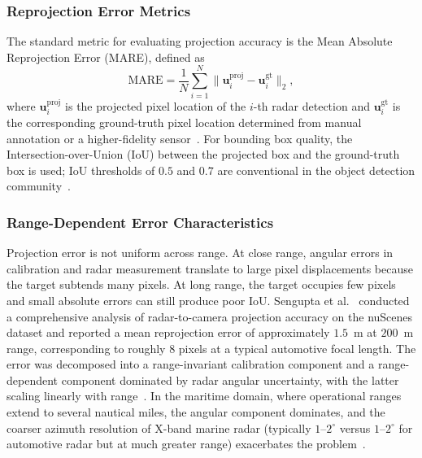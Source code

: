 \subsubsection{Reprojection Error Metrics}

The standard metric for evaluating projection accuracy is the Mean Absolute Reprojection Error (MARE), defined as
\begin{equation}\label{eq:mare}
  \text{MARE} = \frac{1}{N}\sum_{i=1}^{N} \bigl\|\mathbf{u}_i^{\text{proj}} - \mathbf{u}_i^{\text{gt}}\bigr\|_2,
\end{equation}
where $\mathbf{u}_i^{\text{proj}}$ is the projected pixel location of the $i$-th radar detection and $\mathbf{u}_i^{\text{gt}}$ is the corresponding ground-truth pixel location determined from manual annotation or a higher-fidelity sensor~\cite{Nabati2021CenterFusion}. For bounding box quality, the Intersection-over-Union (IoU) between the projected box and the ground-truth box is used; IoU thresholds of $0.5$ and $0.7$ are conventional in the object detection community~\cite{Lin2014COCO}.

\subsubsection{Range-Dependent Error Characteristics}

Projection error is not uniform across range. At close range, angular errors in calibration and radar measurement translate to large pixel displacements because the target subtends many pixels. At long range, the target occupies few pixels and small absolute errors can still produce poor IoU. Sengupta et al.~\cite{sengupta2024comprehensive} conducted a comprehensive analysis of radar-to-camera projection accuracy on the nuScenes dataset and reported a mean reprojection error of approximately $1.5$~m at $200$~m range, corresponding to roughly 8 pixels at a typical automotive focal length. The error was decomposed into a range-invariant calibration component and a range-dependent component dominated by radar angular uncertainty, with the latter scaling linearly with range~\cite{sengupta2024comprehensive}. In the maritime domain, where operational ranges extend to several nautical miles, the angular component dominates, and the coarser azimuth resolution of X-band marine radar (typically $1$--$2^\circ$ versus $1$--$2^\circ$ for automotive radar but at much greater range) exacerbates the problem~\cite{Ward2006}.

